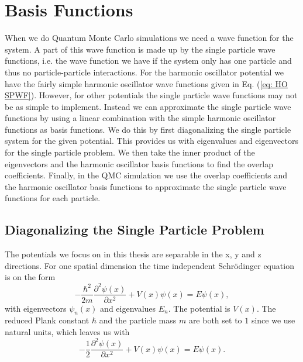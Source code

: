 \documentclass[../main.tex]{subfiles}
\begin{document}

\chapter{Basis Functions}\label{sec: Basis Functions}

When we do Quantum Monte Carlo simulations we need a wave function for the system. A part of this wave function is made up by the single particle wave functions, i.e. the wave function we have if the system only has one particle and thus no particle-particle interactions. For the harmonic oscillator potential we have the fairly simple harmonic oscillator wave functions given in Eq. (\ref{eq: HO SPWF}). However, for other potentials the single particle wave functions may not be as simple to implement. Instead we can approximate the single particle wave functions by using a linear combination with the simple harmonic oscillator functions as basis functions. We do this by first diagonalizing the single particle system for the given potential. This provides us with eigenvalues and eigenvectors for the single particle problem. We then take the inner product of the eigenvectors and the harmonic oscillator basis functions to find the overlap coefficients. Finally, in the QMC simulation we use the overlap coefficients and the harmonic oscillator basis functions to approximate the single particle wave functions for each particle.

\section{Diagonalizing the Single Particle Problem}\label{sec:Diag_SP_Problem}

The potentials we focus on in this thesis are separable in the x, y and z directions. For one spatial dimension the time independent Schr\"odinger equation is on the form\cite{Schrodinger}
\begin{equation}
    -\frac{\hbar^2}{2m}\frac{\partial^2\psi(x)}{\partial x^2} + V(x)\psi(x) = E\psi(x),
\end{equation}
with eigenvectors $\psi_n(x)$ and eigenvalues $E_n$. The potential is $V(x)$. The reduced Plank constant $\hbar$ and the particle mass $m$ are both set to $1$ since we use natural units, which leaves us with
\begin{equation}\label{eq: SEq Natural}
    -\frac{1}{2}\frac{\partial^2\psi(x)}{\partial x^2} + V(x)\psi(x) = E\psi(x).
\end{equation}
\end{document}
